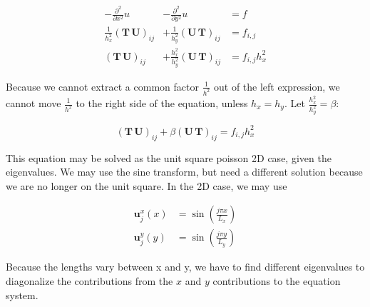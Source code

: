 \begin{equation}
\begin{array}{ccl}
	-\frac{\partial^2 }{\partial x^2} u &-\frac{\partial^2}{\partial y^2} u &= f \\
  \frac{1}{h_x^2}(\mathbf{{T}} \, \mathbf{{U}})_{ij} &+\frac{1}{h_y^2} (\mathbf{{U}} \, \mathbf{{T}})_{ij} &= f_{i,j} \\
	(\mathbf{{T}} \, \mathbf{{U}})_{ij} &+\frac{h_x^2}{h_y^2} (\mathbf{{U}} \, \mathbf{{T}})_{ij} &= f_{i,j} h_x^2
\end{array}
\end{equation}

Because we cannot extract a common factor $\frac{1}{h^2}$ out of the left expression, we cannot move $\frac{1}{h^2}$ to the right side of the equation, unless $h_x = h_y$. Let $\frac{h_x^2}{h_y^2} = \beta$:

\begin{equation}
(\mathbf{{T}} \, \mathbf{{U}})_{ij} +\beta (\mathbf{{U}} \, \mathbf{{T}})_{ij} = f_{i,j} h_x^2
\end{equation}

This equation may be solved as the unit square poisson 2D case, given the eigenvalues. We may use the sine transform, but need a different solution because we are no longer on the unit square. In the 2D case, we may use 

\begin{align}
  \mathbf{u}_j^x(x) &= \sin(\frac{j \pi x}{L_x}) \\
  \mathbf{u}_j^y(y) &= \sin(\frac{j \pi y}{L_y})
\end{align}

Because the lengths vary between x and y, we have to find different eigenvalues to diagonalize the contributions from the $x$ and $y$ contributions to the equation system.
